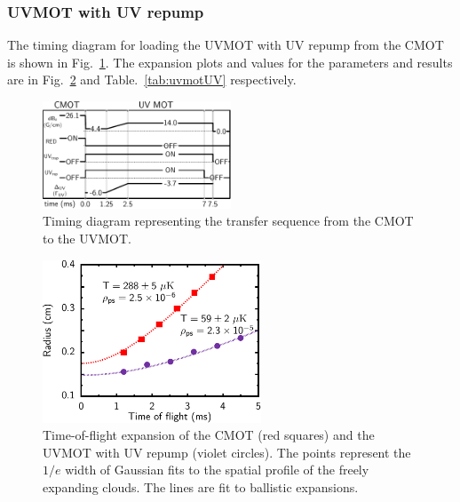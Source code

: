 \documentclass[oneside,12pt]{memoir}
\begin{document}
\subsubsection{UVMOT with UV repump}

The timing diagram for loading the UVMOT with UV repump from the CMOT is shown
in Fig.~\ref{fig:timingUV}.  The expansion plots and values for the parameters
and results are in Fig.~\ref{fig:uvtexpUV} and Table.~\ref{tab:uvmotUV}
respectively. 

\begin{figure} \centering
\includegraphics[width=0.5\textwidth]{../figures/323mot/timingdiagram/timing.pdf}
\caption[UVMOT loading timing diagram]{\small Timing diagram representing the
transfer sequence from the CMOT to the UVMOT. } \label{fig:timingUV} \end{figure}

\begin{figure}
\hspace{0.16\textwidth}
\includegraphics[width=0.58\textwidth]{../figures/323mot/tofexpansion/tofeps.pdf}
\caption[CMOT and UVMOT time-of-flight expansion]{\small Time-of-flight
expansion of the CMOT (red squares) and the UVMOT with UV repump (violet circles).  
The points represent the $1/e$ width of Gaussian fits to the spatial profile of the
freely expanding clouds.  The lines are fit to ballistic expansions. }
\label{fig:uvtexpUV} \end{figure} 
\end{document}
